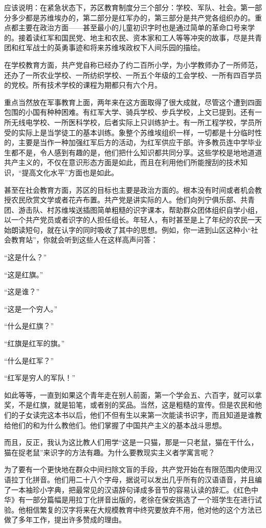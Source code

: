\documentclass[10pt]{book}
\begin{document}
应该说明：在紧急状态下，苏区教育制度分三个部分：学校、军队、社会。第一部分多少都是苏维埃办的，第二部分是红军办的，第三部分是共产党各组织办的。重点都主要在政治方面——甚至最小的儿童初识字时也是通过简单的革命口号来学的。接着读红军和国民党、地主和农民、资本家和工人等等冲突的故事，尽是共青团和红军战士的英勇事迹和将来苏维埃政权下人间乐园的描绘。

在学校教育方面，共产党自称已经办了约二百所小学，为小学教师办了一所师范，还办了一所农业学校、一所纺织学校、一所五个年级的工会学校、一所有四百学员的党校。所有技术学校的课程为期都只有六个月。

重点当然放在军事教育上面，两年来在这方面取得了很大成就，尽管这个遭到四面包围的小国有种种困难。有红军大学、骑兵学校、步兵学校，上文已提到。还有一所无线电学校、一所医科学校，后者实际上只训练护士。有一所工程学校，学员所受的实际上是当学徒工的基本训练。象整个苏维埃组织一样，一切都是十分临时性的，主要是当作一种加强红军后方的活动，为红军供应干部。许多教员连中学毕业生都不是，令人感到有趣的是，他们把什么知识都共同分享。这些学校是地地道道共产主义的，不仅在意识形态方面是如此，而且在利用他们所能搜刮的技术知识，“提高文化水平”方面也是如此。

甚至在社会教育方面，苏区的目标也主要是政治方面的。根本没有时间或者机会教授农民欣赏文学或者花卉布置。共产党是讲实际的人。他们向列宁俱乐部、共青团、游击队、村苏维埃送插图简单粗糙的识字课本，帮助群众团体组织自学小组，以一个共产党员或者识字的人担任组长。年轻人，有时甚至是上了年纪的农民一天始朗读短句，就在认字的同时吸收了其中的思想。例如，你一进到山区这种小“社会教育站”，你就会听到这些人在这样高声问答：

“这是什么？”

“这是红旗。”

“这是谁？”

“这是一个穷人。”

“什么是红旗？”

“红旗是红军的旗。”

“什么是红军？”

“红军是穷人的军队！”

如此等等，一直到如果这个青年走在别人前面，第一个学会五、六百字，就可以拿奖，不是红旗，就是铅笔，或者别的奖品。当然，这是粗糙的宣传。但是农民和他们的子女读完这本书以后，他们不但有生以来第一次能读书识字，而且知道是谁教给他们的和为什么教他们。他们掌握了中国共产主义的基本战斗思想。

而且，反正，我认为这比教人们用学“这是一只猫，那是一只老鼠，猫在干什么，猫在捉老鼠”来识字的方法有趣。为什么要教现实主义者学寓言呢？

为了要有一个更快地在群众中间扫除文盲的手段，共产党开始在有限范围内使用汉语拉丁化拼音。他们用二十八个字母，据说可以发出几乎所有的汉语语音，并且编了一本袖珍小字典，把最常见的汉语辞句译成多音节的容易认读的辞汇。《红色中华》有一部分篇幅是用拉丁化拼音出版的，老徐在保安挑选了一个班学生在进行试验。他相信繁复的汉字将来在大规模教育中终究要放弃不用，他对他的这个方法已做了多年工作，提出许多赞成的理由。
\end{document}
